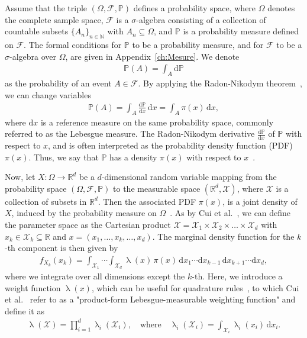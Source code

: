 Assume that the triple $(\Omega, \mathcal{F}, \mathbb{P})$ defines a probability space, where $\Omega$ denotes the complete sample space, $\mathcal{F}$ is a $\sigma$-algebra consisting of a collection of countable subsets $\{A_n\}_{n \in \mathbb{N}}$ with $A_n \subseteq \Omega$, and $\mathbb{P}$ is a probability measure defined on $\mathcal{F}$. The formal conditions for $\mathbb{P}$ to be a probability measure, and for $\mathcal{F}$ to be a $\sigma$-algebra over $\Omega$, are given in Appendix~\ref{ch:Mesure}.
We denote
\begin{align}
	\mathbb{P}(A) = \int_A \mathrm{d} \mathbb{P}
\end{align}
as the probability of an event $A \in \mathcal{F}$.
By applying the Radon-Nikodym theorem~\cite{kopp2004measintprob}, we can change variables
\begin{align}
	\mathbb{P}(A) = \int_A \frac{\mathrm{d} \mathbb{P}}{\mathrm{d}x} \, \mathrm{d}x = \int_A \pi(x) \, \mathrm{d}x,
\end{align}
where $\mathrm{d}x$ is a reference measure on the same probability space, commonly referred to as the Lebesgue measure. 
The Radon-Nikodym derivative $\frac{\mathrm{d} \mathbb{P}}{\mathrm{d}x}$ of $\mathbb{P}$ with respect to $x$, and is often interpreted as the probability density function (PDF) $\pi(x)$. Thus, we say that $\mathbb{P}$ has a density $\pi(x)$ with respect to $x$~\cite[Chapter 10]{simonnet1996measprob}.

Now, let $X: \Omega \longrightarrow \mathbb{R}^d$ be a $d$-dimensional random variable mapping from the probability space $(\Omega, \mathcal{F}, \mathbb{P})$ to the measurable space $(\mathbb{R}^d, \mathcal{X})$, where $\mathcal{X}$ is a collection of subsets in $\mathbb{R}^d$.
Then the associated PDF $\pi(x)$, is a joint density of $X$, induced by the probability measure on $\Omega$~\cite{VesaInvLect, kopp2004measintprob}.
As by Cui et al.~\cite{cui2022deep}, we can define the parameter space as the Cartesian product $\mathcal{X} = \mathcal{X}_1 \times \mathcal{X}_2 \times \dots \times \mathcal{X}_d$ with $ x_k \in \mathcal{X}_k \subseteq \mathbb{R}$ and $x = ( x_1,\dots ,x_k,\dots,x_d )$.
The marginal density function for the $k$-th component is then given by
\begin{align}
	f_{X_k}(x_k) = \int_{\mathcal{X}_1} \cdots \int_{\mathcal{X}_d} \uplambda(x) \, \pi(x) \, \mathrm{d}x_1 \cdots \mathrm{d}x_{k-1} \, \mathrm{d}x_{k+1} \cdots \mathrm{d}x_d,
\end{align}
where we integrate over all dimensions except the $k$-th.
Here, we introduce a weight function $\uplambda(x)$, which can be useful for quadrature rules~\cite{davis2007methods}, to which 
Cui et al.~\cite{cui2022deep} refer to as a "product-form Lebesgue-measurable weighting function" and define it as
\begin{align*}
	\uplambda(\mathcal{X}) = \prod_{i = 1}^{d} \uplambda_i(\mathcal{X}_i), \quad \text{where} \quad \uplambda_i(\mathcal{X}_i) = \int_{\mathcal{X}_i} \uplambda_i(x_i) \, \mathrm{d}x_i. \label{eq:lebesgueWeight}
\end{align*}

